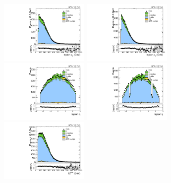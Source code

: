 \begin{figure}[htbp]
  \centering
  \includegraphics[width=0.3825\textwidth]{fig/controlPlots/SB_b1_mu_allP_allC_allD_Run2_lnujj_l1_l_pt.pdf}
  \includegraphics[width=0.3825\textwidth]{fig/controlPlots/SB_b1_e_allP_allC_allD_Run2_lnujj_l1_l_pt.pdf}\\
  \includegraphics[width=0.3825\textwidth]{fig/controlPlots/SB_b1_mu_allP_allC_allD_Run2_lnujj_l1_l_eta.pdf}
  \includegraphics[width=0.3825\textwidth]{fig/controlPlots/SB_b1_e_allP_allC_allD_Run2_lnujj_l1_l_eta.pdf}\\
  \includegraphics[width=0.3825\textwidth]{fig/controlPlots/SB_b1_mu_allP_allC_allD_Run2_met_pt.pdf}

\end{figure}
